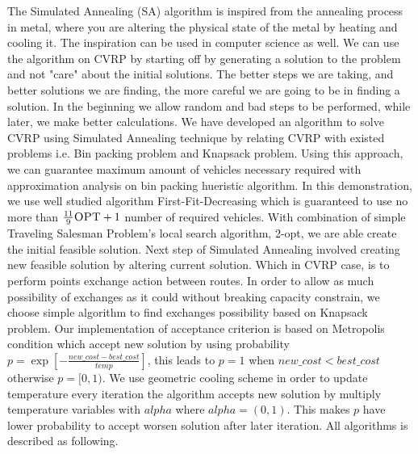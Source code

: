 \documentclass[12pt]{article}
\begin{document}
The Simulated Annealing (SA) algorithm is inspired from the annealing process in metal, where you are altering the physical state of the metal 
by heating and cooling it. The inspiration can be used in computer science as well. We can use the algorithm on CVRP by starting off by generating a solution 
to the problem and not "care" about the initial solutions. The better steps we are taking, and better solutions we are finding, the more careful we are going to be in finding 
a solution. In the beginning we allow random and bad steps to be performed, while later, we make better calculations.
\newline
We have developed an algorithm to solve CVRP using Simulated Annealing technique by relating CVRP with existed problems i.e. Bin packing problem and Knapsack problem. Using this approach, we can guarantee maximum amount of vehicles necessary required with approximation analysis on bin packing hueristic algorithm. In this demonstration, we use well studied  algorithm First-Fit-Decreasing which is guaranteed to use no more than $\frac{11}{9}\textsc{OPT} + 1$ number of required vehicles\cite{FFD}. With combination of simple Traveling Salesman Problem's local search algorithm, 2-opt, we are able create the initial feasible solution. Next step of Simulated Annealing involved creating new feasible solution by altering current solution. Which in CVRP case, is to perform points exchange action between routes. In order to allow as much possibility of exchanges as it could without breaking capacity constrain, we choose simple algorithm to find exchanges possibility based on Knapsack problem. Our implementation of acceptance criterion is based on Metropolis condition which accept new solution by using probability $p = \exp[−\frac{new\_cost − best\_cost}{temp}]$, this leads to $p = 1$ when $new\_cost < best\_cost$ otherwise $p = [0,1)$. We use geometric cooling scheme in order to update temperature every iteration the algorithm accepts new solution by multiply temperature variables with $alpha$ where  $alpha=(0,1)$. This makes $p$ have lower probability to accept worsen solution after later iteration. All algorithms is described as following.
\end{document}
